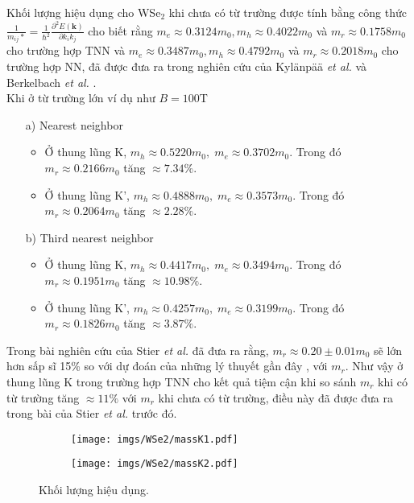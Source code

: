 \documentclass{article}
\begin{document}
Khối lượng hiệu dụng cho WSe$_{2}$ khi chưa có từ trường được tính bằng công thức $\frac{1}{m_{ij}*} =\frac{1}{\hbar^{2}} \frac{\partial^{2} E(\mathbf{k})}{\partial k_{i} k_{j}}$ cho biết rằng $m_{e} \approx 0.3124 m_{0}, m_{h} \approx 0.4022 m_{0}$ và $m_{r} \approx 0.1758 m_{0}$ cho trường hợp TNN và $m_{e} \approx 0.3487 m_{0}, m_{h} \approx 0.4792 m_{0}$ và $m_{r} \approx 0.2018 m_{0}$ cho trường hợp NN, đã được đưa ra trong nghiên cứu của Kyl\"{a}np\"{a}\"{a} \textit{et al.} và Berkelbach \textit{et al.} \cite{kylanpaa2015,berkelbach2013}. \\
Khi ở từ trường lớn ví dụ như $B = 100 $T
\begin{itemize}
	\item[a)] Nearest neighbor
	\begin{itemize}
		\item Ở thung lũng K, $m_{h} \approx 0.5220 m_{0},\; m_{e} \approx 0.3702 m_{0}$. 
		Trong đó $m_{r} \approx 0.2166 m_{0}$ tăng $\approx 7.34\%$.
		
		\item Ở thung lũng K', $m_{h} \approx 0.4888 m_{0},\; m_{e} \approx 0.3573 m_{0}$. 
		Trong đó $m_{r} \approx 0.2064 m_{0}$ tăng $\approx 2.28\%$.
	\end{itemize}
	\item[b)] Third nearest neighbor
	\begin{itemize}
		\item Ở thung lũng K, $m_{h} \approx 0.4417 m_{0},\; m_{e} \approx 0.3494 m_{0}$. 
		Trong đó $m_{r} \approx 0.1951 m_{0}$ tăng $\approx 10.98\%$.
		
		\item Ở thung lũng K', $m_{h} \approx 0.4257 m_{0},\; m_{e} \approx 0.3199 m_{0}$. 
		Trong đó $m_{r} \approx 0.1826 m_{0}$ tăng $\approx 3.87\%$.
	\end{itemize}
\end{itemize}
Trong bài nghiên cứu của Stier \textit{et al.} \cite{stier2018} đã đưa ra rằng, $m_{r} \approx 0.20 \pm 0.01 m_{0}$ sẽ lớn hơn sấp sĩ 15\% so với dự đoán của những lý thuyết gần đây \cite{berkelbach2013,kylanpaa2015}, với $m_{r}$.  Như vậy ở thung lũng K trong trường hợp TNN cho kết quả tiệm cận khi so sánh $m_{r}$ khi có từ trường tăng $\approx 11\%$ với $m_{r}$ khi chưa có từ trường, điều này đã được đưa ra trong bài của Stier \textit{et al.}\cite{stier2018} trước đó.
\begin{figure}[htb]
	\begin{subfigure}{0.495\textwidth}
		\centering
		\texttt{[image: imgs/WSe2/massK1.pdf]}
	\end{subfigure}
	\begin{subfigure}{0.495\textwidth}
		\centering
		\texttt{[image: imgs/WSe2/massK2.pdf]}
	\end{subfigure}
	\caption{Khối lượng hiệu dụng.}
\end{figure}
\end{document}
